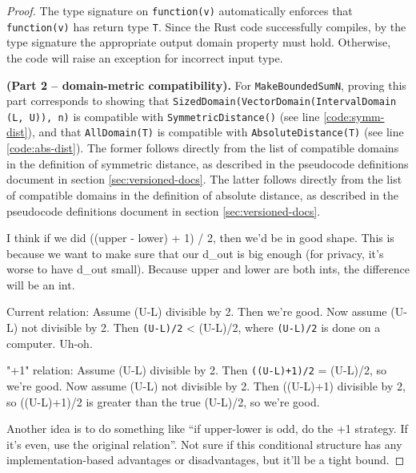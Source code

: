 \documentclass[11pt,a4paper]{article}
\theoremstyle{definition}
\newcommand{\connor}[1]{{ {\color{teal}{(connor)~#1}}}}
\begin{document}
\begin{proof}
    The type signature on \texttt{function(v)} automatically enforces that \texttt{function(v)} has return type \texttt{T}. Since the Rust code successfully compiles, by the type signature the appropriate output domain property must hold. Otherwise, the code will raise an exception for incorrect input type.
    
    \smallskip
    
    \textbf{(Part 2 -- domain-metric compatibility).} For \texttt{MakeBoundedSumN}, proving this part corresponds to showing that \texttt{SizedDomain(VectorDomain(IntervalDomain (L, U)), n)} is compatible with \texttt{SymmetricDistance()} (see line \ref{code:symm-dist}), and that \texttt{AllDomain(T)} is compatible with \texttt{AbsoluteDistance(T)} (see line \ref{code:abs-dist}).
    The former follows directly from the list of compatible domains in the definition of symmetric distance, as described in the pseudocode definitions document in section \ref{sec:versioned-docs}. The latter follows directly from the list of compatible domains in the definition of absolute distance, as described in the pseudocode definitions document in section \ref{sec:versioned-docs}. 
    
    
    \iffalse
    \smallskip
    
    \connor{Problem with current stability guarantee. Ideas copied from Slack, so sorry about the formatting.}
    
    \color{teal}
    
    I think if we did ((upper - lower) + 1) / 2, then we'd be in good shape. This is because we want to make sure that our d\_out is big enough (for privacy, it's worse to have d\_out small). Because upper and lower are both ints, the difference will be an int.

    Current relation: Assume (U-L) divisible by 2. Then we're good. Now assume (U-L) not divisible by 2. Then \texttt{(U-L)/2} < (U-L)/2, where \texttt{(U-L)/2} is done on a computer. Uh-oh.

    "+1" relation: Assume (U-L) divisible by 2. Then \texttt{((U-L)+1)/2} = (U-L)/2, so we're good. Now assume (U-L) not divisible by 2. Then ((U-L)+1) divisible by 2, so ((U-L)+1)/2 is greater than the true (U-L)/2, so we're good.
    
    
    Another idea is to do something like ``if upper-lower is odd, do the +1 strategy. If it's even, use the original relation''. Not sure if this conditional structure has any implementation-based advantages or disadvantages, but it'll be a tight bound.
    

\end{proof}
\end{document}
